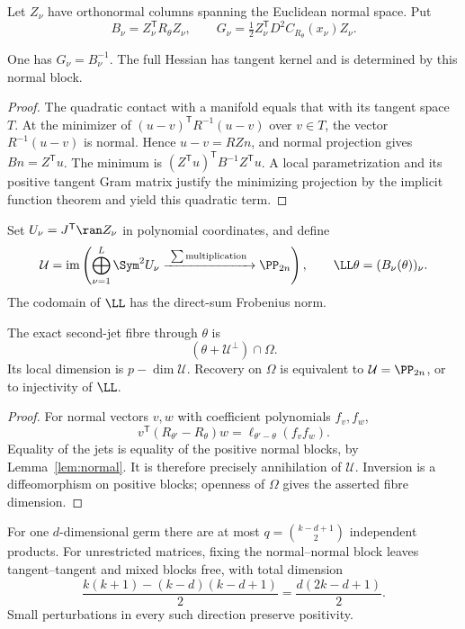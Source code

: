 Let $Z_\nu$ have orthonormal columns spanning the Euclidean normal space. Put
\[
 B_\nu=Z_\nu^{\mathsf T}R_\theta Z_\nu,\qquad
 G_\nu=\tfrac12Z_\nu^{\mathsf T}D^2C_{R_\theta}(x_\nu)Z_\nu.
\]
\begin{lemma}\label{lem:normal}
One has $G_\nu=B_\nu^{-1}$. The full Hessian has tangent kernel and is determined by this normal block.
\end{lemma}
\begin{proof}
The quadratic contact with a manifold equals that with its tangent space $T$. At the minimizer of $(u-v)^{\mathsf T}R^{-1}(u-v)$ over $v\in T$, the vector $R^{-1}(u-v)$ is normal. Hence $u-v=RZn$, and normal projection gives $Bn=Z^{\mathsf T}u$. The minimum is $(Z^{\mathsf T}u)^{\mathsf T}B^{-1}Z^{\mathsf T}u$. A local parametrization and its positive tangent Gram matrix justify the minimizing projection by the implicit function theorem and yield this quadratic term.
\end{proof}
Set $U_\nu=J^{\mathsf T}\ran Z_\nu$ in polynomial coordinates, and define
\[
 \mathcal U=\operatorname{im}\left(\bigoplus_{\nu=1}^L\Sym^2U_\nu
                  \xrightarrow{\ \sum\mathrm{multiplication}\ }\PP_{2n}\right),
 \qquad \LL\theta=(B_\nu(\theta))_\nu.
\]
The codomain of $\LL$ has the direct-sum Frobenius norm.
\begin{theorem}\label{thm:fibre}
The exact second-jet fibre through $\theta$ is
\[
 (\theta+\mathcal U^\perp)\cap\Omega.
\]
Its local dimension is $p-\dim\mathcal U$. Recovery on $\Omega$ is equivalent to $\mathcal U=\PP_{2n}$, or to injectivity of $\LL$.
\end{theorem}
\begin{proof}
For normal vectors $v,w$ with coefficient polynomials $f_v,f_w$,
\[
 v^{\mathsf T}(R_{\theta'}-R_\theta)w
       =\ell_{\theta'-\theta}(f_vf_w).
\]
Equality of the jets is equality of the positive normal blocks, by Lemma~\ref{lem:normal}. It is therefore precisely annihilation of $\mathcal U$. Inversion is a diffeomorphism on positive blocks; openness of $\Omega$ gives the asserted fibre dimension.
\end{proof}
For one $d$-dimensional germ there are at most $q=\binom{k-d+1}{2}$ independent products. For unrestricted matrices, fixing the normal--normal block leaves tangent--tangent and mixed blocks free, with total dimension
\begin{equation}\label{eq:ambient}
 \frac{k(k+1)-(k-d)(k-d+1)}2=\frac{d(2k-d+1)}2.
\end{equation}
Small perturbations in every such direction preserve positivity.

